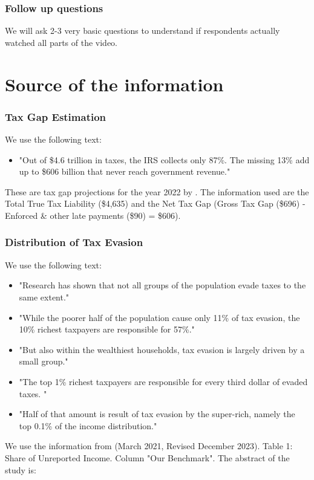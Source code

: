 \documentclass[11pt]{article}
\begin{document}
\subsubsection*{Follow up questions}
We will ask 2-3 very basic questions to understand if respondents actually watched all parts of the video.
\newpage
\section{Source of the information}
\subsubsection*{Tax Gap Estimation}
We use the following text:
\begin{itemize}
    \item "Out of \$4.6 trillion in taxes, the IRS collects only 87\%. The missing 13\% add up to \$606 billion that never reach government revenue."
\end{itemize}
These are tax gap projections for the year 2022 by \cite{IRS_TaxGap_2022_Pub5869}. The information used are the Total True Tax Liability (\$4,635) and the Net Tax Gap (Gross Tax Gap (\$696) - Enforced \& other late payments (\$90) = \$606). 
\subsubsection*{Distribution of Tax Evasion}
We use the following text:
\begin{itemize}
    \item "Research has shown that not all groups of the population evade taxes to the same extent." 
    \item "While the poorer half of the population cause only 11\% of tax evasion, the 10\% richest taxpayers are responsible for 57\%." 
    \item "But also within the wealthiest households, tax evasion is largely driven by a small group." 
    \item "The top 1\% richest taxpayers are responsible for every third dollar of evaded taxes. " 
    \item "Half of that amount is result of tax evasion by the super-rich, namely the top 0.1\% of the income distribution."
\end{itemize}
We use the information from \cite{guyton2021tax} (March 2021, Revised December 2023). Table 1: Share of Unreported Income. Column "Our Benchmark". The abstract of the study is: 
\vspace{1em}
\end{document}

